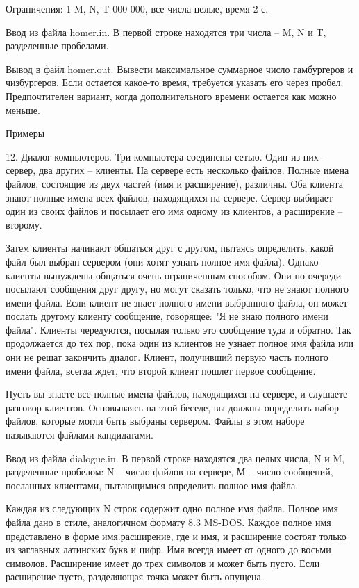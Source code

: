 \documentclass[]{article}
\begin{document}
\begin{enumerate}
Ограничения: 1 \leq M, N, T  000 000, все числа целые, время 2 с.

Ввод из файла homer.in. В первой строке находятся три числа – M, N и T, разделенные пробелами.

Вывод в файл homer.out. Вывести максимальное суммарное число гамбургеров и чизбургеров. Если остается какое-то время, требуется указать его через пробел. Предпочтителен вариант, когда дополнительного времени остается как можно меньше.

Примеры



12. Диалог компьютеров. Три компьютера соединены сетью. Один из них – сервер, два других – клиенты. На сервере есть несколько файлов. Полные имена файлов, состоящие из двух частей (имя и расширение), различны. Оба клиента знают полные имена всех файлов, находящихся на сервере. Сервер выбирает один из своих файлов и посылает его имя одному из клиентов, а расширение – второму.

Затем клиенты начинают общаться друг с другом, пытаясь определить, какой файл был выбран сервером (они хотят узнать полное имя файла). Однако клиенты вынуждены общаться очень ограниченным способом. Они по очереди посылают сообщения друг другу, но могут сказать только, что не знают полного имени файла. Если клиент не знает полного имени выбранного файла, он может послать другому клиенту сообщение, говорящее: "Я не знаю полного имени файла". Клиенты чередуются, посылая только это сообщение туда и обратно. Так продолжается до тех пор, пока один из клиентов не узнает полное имя файла или они не решат закончить диалог. Клиент, получивший первую часть полного имени файла, всегда ждет, что второй клиент пошлет первое сообщение.

Пусть вы знаете все полные имена файлов, находящихся на сервере, и слушаете разговор клиентов. Основываясь на этой беседе, вы должны определить набор файлов, которые могли быть выбраны сервером. Файлы в этом наборе называются файлами-кандидатами.

Ввод из файла dialogue.in. В первой строке находятся два целых числа, N и M, разделенные пробелом: N – число файлов на сервере, М – число сообщений, посланных клиентами, пытающимися определить полное имя файла.

Каждая из следующих N строк содержит одно полное имя файла. Полное имя файла дано в стиле, аналогичном формату 8.3 MS-DOS. Каждое полное имя представлено в форме имя.расширение, где и имя, и расширение состоят только из заглавных латинских букв и цифр. Имя всегда имеет от одного до восьми символов. Расширение имеет до трех символов и может быть пусто. Если расширение пусто, разделяющая точка может быть опущена.


\end{enumerate}
\end{document}
